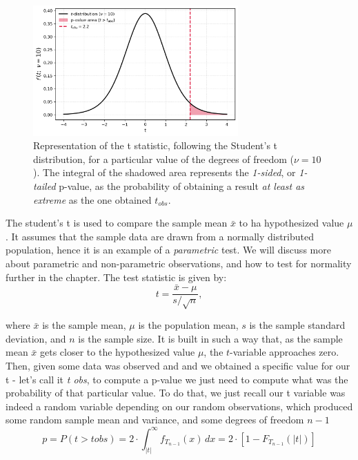 \documentclass{book}
\begin{document}
\begin{figure}[ht]
    \centering
    \includegraphics[width=0.7\textwidth]{figures/chapter4/t_test_1_sample_p_one_tailed.png}
    \caption{Representation of the t statistic, following the Student's t distribution, for a particular value of the degrees of freedom ($\nu = 10$). The integral of the shadowed area represents the \textit{1-sided}, or \textit{1-tailed} p-value, as the probability of obtaining a result \textit{at least as extreme} as the one obtained $t_{obs}$.}
    \label{fig:t_test1}
\end{figure}

The student's t is used to compare the sample mean $\bar{x}$ to ha hypothesized value $\mu$. It assumes that the sample data are drawn from a normally distributed population, hence it is an example of a \textit{parametric} test. We will discuss more about parametric and non-parametric observations, and how to test for normality further in the chapter. The test statistic is given by:
\[
    t = \frac{\bar{x} - \mu}{s / \sqrt{n}},
\]

where $\bar{x}$ is the sample mean, $\mu$ is the population mean, $s$ is the sample standard deviation, and $n$ is the sample size. It is built in such a way that, as the sample mean $\bar{x}$ gets closer to the hypothesized value $\mu$, the $t$-variable approaches zero.\\

Then, given some data was observed and and we obtained a specific value for our t - let's call it \textit{t obs}, to compute a p-value we just need to compute what was the probability of that particular value. To do that, we just recall our t variable was indeed a random variable depending on our random observations, which produced some random sample mean and variance, and some degrees of freedom $n - 1$
\[
p = P\left(t > t obs \right) = 2 \cdot \int_{|t|}^{\infty} f_{T_{n-1}}(x)\,dx = 2 \cdot \left[1 - F_{T_{n-1}}(|t|)\right]
\]
\end{document}
